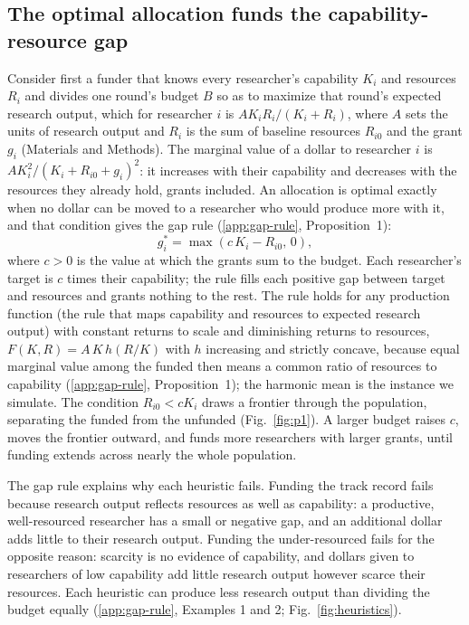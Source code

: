 \documentclass[article, 11pt, reqno]{amsart}
\theoremstyle{named}
\begin{document}
\subsection*{The optimal allocation funds the capability-resource gap}
Consider first a funder that knows every researcher's capability $K_i$ and resources $R_i$ and divides one round's budget $B$ so as to maximize that round's expected research output, which for researcher $i$ is $AK_iR_i/(K_i + R_i)$, where $A$ sets the units of research output and $R_i$ is the sum of baseline resources $R_{i0}$ and the grant $g_i$ (Materials and Methods). The marginal value of a dollar to researcher $i$ is $AK_i^2/(K_i + R_{i0} + g_i)^2$: it increases with their capability and decreases with the resources they already hold, grants included. An allocation is optimal exactly when no dollar can be moved to a researcher who would produce more with it, and that condition gives the gap rule (\ref{app:gap-rule}, Proposition~1):
\[
g_i^* = \max(c\,K_i - R_{i0},\, 0),
\]
where $c > 0$ is the value at which the grants sum to the budget. Each researcher's target is $c$ times their capability; the rule fills each positive gap between target and resources and grants nothing to the rest. The rule holds for any production function (the rule that maps capability and resources to expected research output) with constant returns to scale and diminishing returns to resources, $F(K, R) = A\,K\,h(R/K)$ with $h$ increasing and strictly concave, because equal marginal value among the funded then means a common ratio of resources to capability (\ref{app:gap-rule}, Proposition~1); the harmonic mean is the instance we simulate. The condition $R_{i0} < cK_i$ draws a frontier through the population, separating the funded from the unfunded (Fig.~\ref{fig:p1}). A larger budget raises $c$, moves the frontier outward, and funds more researchers with larger grants, until funding extends across nearly the whole population.

The gap rule explains why each heuristic fails. Funding the track record fails because research output reflects resources as well as capability: a productive, well-resourced researcher has a small or negative gap, and an additional dollar adds little to their research output. Funding the under-resourced fails for the opposite reason: scarcity is no evidence of capability, and dollars given to researchers of low capability add little research output however scarce their resources. Each heuristic can produce less research output than dividing the budget equally (\ref{app:gap-rule}, Examples 1 and 2; Fig.~\ref{fig:heuristics}).
\end{document}
